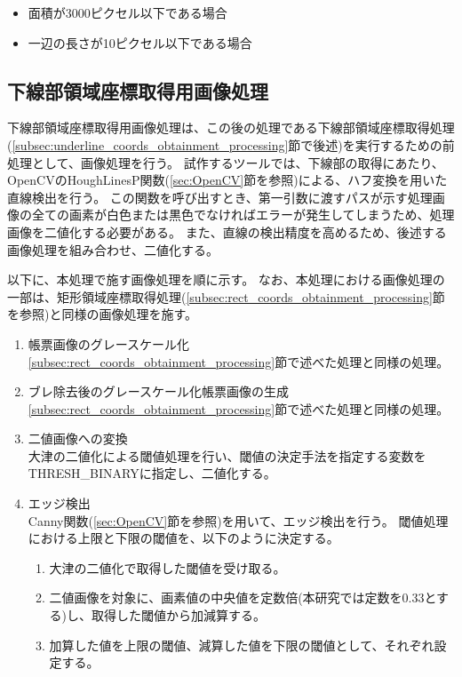 \begin{itemize}
    \item 面積が3000ピクセル以下である場合
    \item 一辺の長さが10ピクセル以下である場合
\end{itemize}

\subsection{下線部領域座標取得用画像処理}\label{subsec:image_processing_for_underline_coords_obtainment}
下線部領域座標取得用画像処理は、この後の処理である下線部領域座標取得処理(\ref{subsec:underline_coords_obtainment_processing}節で後述)を実行するための前処理として、画像処理を行う。
試作するツールでは、下線部の取得にあたり、OpenCVのHoughLinesP関数(\ref{sec:OpenCV}節を参照)による、ハフ変換を用いた直線検出を行う。
この関数を呼び出すとき、第一引数に渡すパスが示す処理画像の全ての画素が白色または黒色でなければエラーが発生してしまうため、処理画像を二値化する必要がある。
また、直線の検出精度を高めるため、後述する画像処理を組み合わせ、二値化する。

以下に、本処理で施す画像処理を順に示す。
なお、本処理における画像処理の一部は、矩形領域座標取得処理(\ref{subsec:rect_coords_obtainment_processing}節を参照)と同様の画像処理を施す。

\begin{enumerate}
    \item 帳票画像のグレースケール化\\
        \ref{subsec:rect_coords_obtainment_processing}節で述べた処理と同様の処理。
    \item ブレ除去後のグレースケール化帳票画像の生成\\
        \ref{subsec:rect_coords_obtainment_processing}節で述べた処理と同様の処理。
    \item 二値画像への変換\\
        大津の二値化による閾値処理を行い、閾値の決定手法を指定する変数をTHRESH\_BINARYに指定し、二値化する。
    \item エッジ検出\\
        Canny関数(\ref{sec:OpenCV}節を参照)を用いて、エッジ検出を行う。
        閾値処理における上限と下限の閾値を、以下のように決定する。
        \begin{enumerate}
            \item 大津の二値化で取得した閾値を受け取る。
            \item 二値画像を対象に、画素値の中央値を定数倍(本研究では定数を0.33とする)し、取得した閾値から加減算する。
            \item 加算した値を上限の閾値、減算した値を下限の閾値として、それぞれ設定する。
        \end{enumerate}
\end{enumerate}



